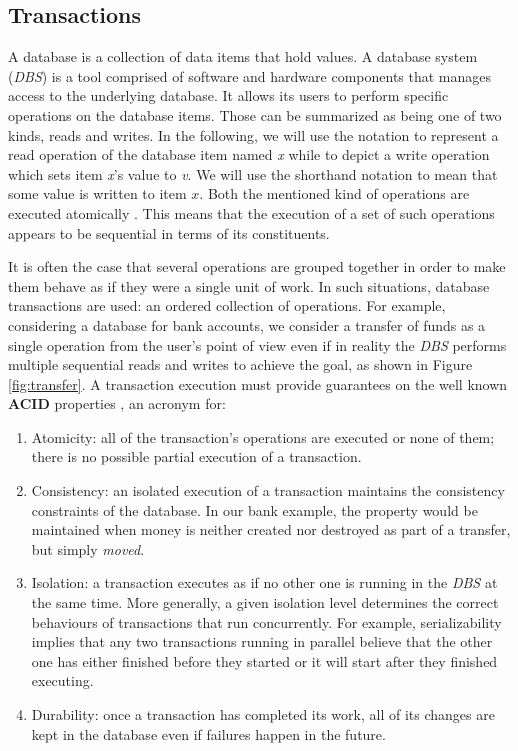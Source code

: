 \subsection{Transactions}

A database is a collection of data items that hold values. A database system (\textit{DBS}) is a tool comprised of software and hardware components that manages access to the underlying database. It allows its users to perform specific operations on the database items. Those can be summarized as being one of two kinds, reads and writes. In the following, we will use the notation  to represent a read operation of the database item named \textit{x} while  to depict a write operation which sets item \textit{x}'s value to \textit{v}. We will use the shorthand notation  to mean that some value is written to item $x$. Both the mentioned kind of operations are executed atomically \cite{ccontrol}. This means that the execution of a set of such operations appears to be sequential in terms of its constituents.

It is often the case that several operations are grouped together in order to make them behave as if they were a single unit of work. In such situations, database transactions are used: an ordered collection of operations. For example, considering a database for bank accounts, we consider a transfer of funds as a single operation from the user's point of view even if in reality the \textit{DBS} performs multiple sequential reads and writes to achieve the goal, as shown in Figure \ref{fig:transfer}. A transaction execution must provide guarantees on the well known \textbf{ACID} properties \cite{dbconcepts}, an acronym for:
\begin{enumerate}[ref=(\arabic*)]
\item \label{acid.a} Atomicity: all of the transaction's operations are executed or none of them; there is no possible partial execution of a transaction.
\item \label{acid.c} Consistency: an isolated execution of a transaction maintains the consistency constraints of the database. In our bank example, the property would be maintained when money is neither created nor destroyed as part of a transfer, but simply \textit{moved}.
\item \label{acid.i} Isolation: a transaction executes as if no other one is running in the \textit{DBS} at the same time. More generally, a given isolation level determines the correct behaviours of transactions that run concurrently. For example, serializability implies that any two transactions running in parallel believe that the other one has either finished before they started or it will start after they finished executing.
\item \label{acid.d} Durability: once a transaction has completed its work, all of its changes are kept in the database even if failures happen in the future.
\end{enumerate}


